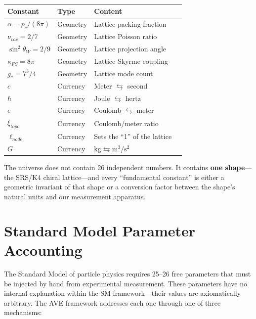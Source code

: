 \begin{center}
\small
\begin{tabular}{llll}
\toprule
\textbf{Constant} & \textbf{Type} & \textbf{Content} \\
\midrule
$\alpha = p_c/(8\pi)$ & Geometry & Lattice packing fraction \\
$\nu_{vac} = 2/7$ & Geometry & Lattice Poisson ratio \\
$\sin^2\theta_W = 2/9$ & Geometry & Lattice projection angle \\
$\kappa_{FS} = 8\pi$ & Geometry & Lattice Skyrme coupling \\
$g_* = 7^3/4$ & Geometry & Lattice mode count \\
\midrule
$c$ & Currency & Meter $\leftrightarrows$ second \\
$\hbar$ & Currency & Joule $\leftrightarrows$ hertz \\
$e$ & Currency & Coulomb $\leftrightarrows$ meter \\
$\xi_{topo}$ & Currency & Coulomb/meter ratio \\
$\ell_{node}$ & Currency & Sets the ``1'' of the lattice \\
$G$ & Currency & $\text{kg} \leftrightarrows \text{m}^3/\text{s}^2$ \\
\bottomrule
\end{tabular}
\end{center}

\noindent
The universe does not contain 26 independent numbers.  It contains
\textbf{one shape}---the SRS/K4 chiral lattice---and every
``fundamental constant'' is either a geometric invariant of that shape
or a conversion factor between the shape's natural units and our
measurement apparatus.

\section{Standard Model Parameter Accounting}
\label{sec:sm_parameter_accounting}

The Standard Model of particle physics requires 25--26 free parameters that
must be injected by hand from experimental measurement. These parameters have
no internal explanation within the SM framework---their values are
axiomatically arbitrary. The AVE framework addresses each one through one of
three mechanisms:

